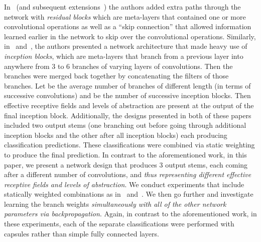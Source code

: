 \documentclass{article}
\begin{document}
In~\cite{He2015} (and subsequent extensions~\cite{Srivastava2015}\cite{Xie2017}\cite{Jgou2017}\cite{Zhang2020}) the authors added extra paths through the network with \textit{residual blocks} which are meta-layers that contained one or more convolutional operations as well as a ``skip connection'' that allowed information learned earlier in the network to skip over the convolutional operations.  Similarly, in~\cite{Szegedy2015a} and~\cite{Szegedy2015b}, the authors presented a network architecture that made heavy use of \textit{inception blocks}, which are meta-layers that branch from a previous layer into anywhere from 3 to 6 branches of varying layers of convolutions.  Then the branches were merged back together by concatenating the filters of those branches.  Let  be the average number of branches of different length (in terms of successive convolutions) and  be the number of successive inception blocks.  Then  effective receptive fields and levels of abstraction are present at the output of the final inception block.  Additionally, the designs presented in both of these papers included two output stems (one branching out before going through additional inception blocks and the other after all inception blocks) each producing classification predictions.  These classifications were combined via static weighting to produce the final prediction.  In contrast to the aforementioned work, in this paper, we present a network design that produces 3 output stems, each coming after a different number of convolutions, and \textit{thus representing different effective receptive fields and levels of abstraction}.  We conduct experiments that include statically weighted combinations as in~\cite{Szegedy2015a} and~\cite{Szegedy2015b}.  We then go further and investigate learning the branch weights \textit{simultaneously with all of the other network parameters via backpropagation}.  Again, in contrast to the aforementioned work, in these experiments, each of the separate classifications were performed with capsules rather than simple fully connected layers.
\end{document}
